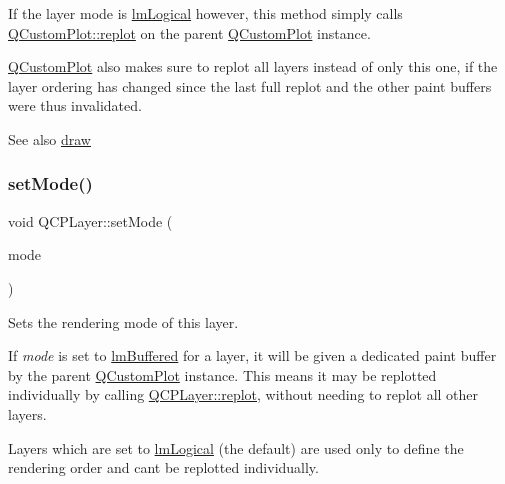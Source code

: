 If the layer mode is \hyperlink{class_q_c_p_layer_a67dcfc1590be2a1f2227c5a39bb59c7ca02eb5e9a4cb7f1baf1e2b6b99e3b87ce}{lm\+Logical} however, this method simply calls \hyperlink{class_q_custom_plot_aa4bfe7d70dbe67e81d877819b75ab9af}{Q\+Custom\+Plot\+::replot} on the parent \hyperlink{class_q_custom_plot}{Q\+Custom\+Plot} instance.

\hyperlink{class_q_custom_plot}{Q\+Custom\+Plot} also makes sure to replot all layers instead of only this one, if the layer ordering has changed since the last full replot and the other paint buffers were thus invalidated.

\begin{DoxySeeAlso}{See also}
\hyperlink{class_q_c_p_layer_ab831a99c8d30b15ec4533ca341e8813b}{draw} 
\end{DoxySeeAlso}
\mbox{\label{class_q_c_p_layer_a938d57b04f4e4c23cedf1711f983919b}} 
\subsubsection{\texorpdfstring{set\+Mode()}{setMode()}}
{\footnotesize\ttfamily void Q\+C\+P\+Layer\+::set\+Mode (\begin{DoxyParamCaption}\item[{\hyperlink{class_q_c_p_layer_a67dcfc1590be2a1f2227c5a39bb59c7c}{Q\+C\+P\+Layer\+::\+Layer\+Mode}}]{mode }\end{DoxyParamCaption})}

Sets the rendering mode of this layer.

If {\itshape mode} is set to \hyperlink{class_q_c_p_layer_a67dcfc1590be2a1f2227c5a39bb59c7cab581b9fab3007c4c65f057f4185d7538}{lm\+Buffered} for a layer, it will be given a dedicated paint buffer by the parent \hyperlink{class_q_custom_plot}{Q\+Custom\+Plot} instance. This means it may be replotted individually by calling \hyperlink{class_q_c_p_layer_adefd53b6db02f470151c416f42e37180}{Q\+C\+P\+Layer\+::replot}, without needing to replot all other layers.

Layers which are set to \hyperlink{class_q_c_p_layer_a67dcfc1590be2a1f2227c5a39bb59c7ca02eb5e9a4cb7f1baf1e2b6b99e3b87ce}{lm\+Logical} (the default) are used only to define the rendering order and can\textquotesingle{}t be replotted individually.

